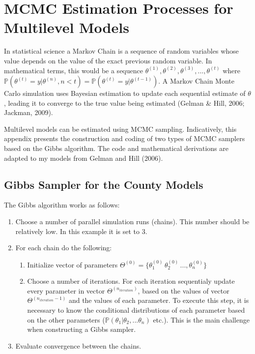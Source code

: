 \documentclass[12pt,twoside]{reedthesis}
\begin{document}
  \appendix
  
  \chapter{MCMC Estimation Processes for Multilevel
  Models}\label{mcmc-estimation-processes-for-multilevel-models}
  
  In statistical science a Markov Chain is a sequence of random variables
  whose value depends on the value of the exact previous random variable.
  In mathematical terms, this would be a sequence
  \(\theta^{(1)}, \theta^{(2)}, \theta^{(3)}, ..., \theta^{(t)}\) where
  \(\mathbb{P}(\theta^{(t)} = y|\theta^{(n)}, n<t) = \mathbb{P}(\theta^{(t)} = y|\theta^{(t-1)})\).
  A Markov Chain Monte Carlo simulation uses Bayesian estimation to update
  each sequential estimate of \(\theta\), leading it to converge to the
  true value being estimated (Gelman \& Hill, 2006; Jackman, 2009).
  
  Multilevel models can be estimated using MCMC sampling. Indicatively,
  this appendix presents the construction and coding of two types of MCMC
  samplers based on the Gibbs algorithm. The code and mathematical
  derivations are adapted to my models from Gelman and Hill (2006).
  
  \section{Gibbs Sampler for the County
  Models}\label{gibbs-sampler-for-the-county-models}
  
  The Gibbs algorithm works as follows:
  
  \begin{enumerate}
    \item Choose a number of parallel simulation runs (chains). This number should be relatively low. In this example it is set to 3.
    \item For each chain do the following:
    \begin{enumerate}
      \item Initialize vector of parameters $\Theta^{(0)} = \{\theta^{(0)}_1\, \theta^{(0)}_2\, ..., \theta^{(0)}_n\}$
      \item Choose a number of iterations. For each iteration sequentialy update every parameter in vector $\Theta^{(n_{iteration})}$, based on the values of vector $\Theta^{(n_{iteration} - 1)}$ and the values of each parameter. To execute this step, it is necessary to know the conditional distributions of each parameter based on the other parameters ($\mathbb{P}(\theta_1|\theta_2,... \theta_n)$ etc.). This is the main challenge when constructing a Gibbs sampler.
    \end{enumerate}
    \item Evaluate convergence between the chains.
  \end{enumerate}
  
\end{document}

